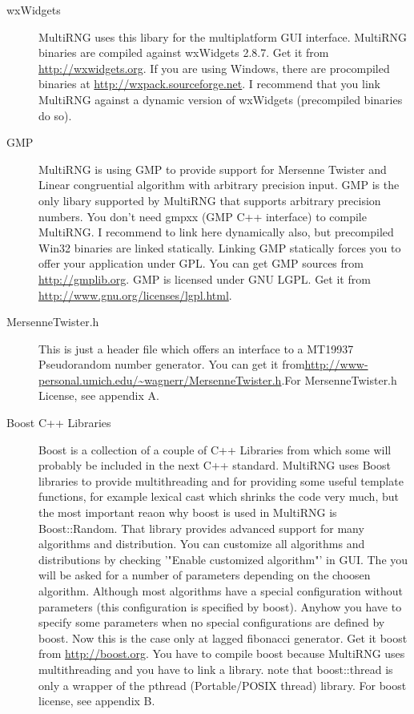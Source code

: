 \documentclass{scrartcl}
\begin{document}
\begin{description}
\item[wxWidgets]MultiRNG uses this libary for the multiplatform GUI interface. MultiRNG binaries are compiled against wxWidgets 2.8.7. Get it from \url{http://wxwidgets.org}. If you are using Windows, there are procompiled binaries at \url{http://wxpack.sourceforge.net}. I recommend that you link MultiRNG against a dynamic version of wxWidgets (precompiled binaries do so).
\item[GMP]MultiRNG is using GMP to provide support for Mersenne Twister and Linear congruential algorithm with arbitrary precision input. GMP is the only libary supported by MultiRNG that supports arbitrary precision numbers. You don't need gmpxx (GMP C++ interface) to compile MultiRNG. I recommend to link here dynamically also, but precompiled Win32 binaries are linked statically. Linking GMP statically forces you to offer your application under GPL. You can get GMP sources from \url{http://gmplib.org}. GMP is licensed under GNU LGPL. Get it from \url{http://www.gnu.org/licenses/lgpl.html}.

\item[MersenneTwister.h]This is just a header file which offers an interface to a MT19937 Pseudorandom number generator. You can get it from\newline \url{http://www-personal.umich.edu/~wagnerr/MersenneTwister.h}.\newline For MersenneTwister.h License, see appendix A.

\item[Boost C++ Libraries]Boost is a collection of a couple of C++ Libraries from which some will probably be included in the next C++ standard. MultiRNG uses Boost libraries to provide multithreading and for providing some useful template functions, for example lexical cast which shrinks the code very much, but the most important reaon why boost is used in MultiRNG is Boost::Random. That library provides advanced support for many algorithms and distribution. You can customize all algorithms and distributions by checking '"Enable customized algorithm"' in GUI. The you will be asked for a number of parameters depending on the choosen algorithm. Although most algorithms have a special configuration without parameters (this configuration is specified by boost). Anyhow you have to specify some parameters when no special configurations are defined by boost. Now this is the case only at lagged fibonacci generator. Get it boost from \url{http://boost.org}. You have to compile boost because MultiRNG uses multithreading and you have to link a library. note that boost::thread is only a wrapper of the pthread (Portable/POSIX thread) library. For boost license, see appendix B.
\end{description}
\end{document}
